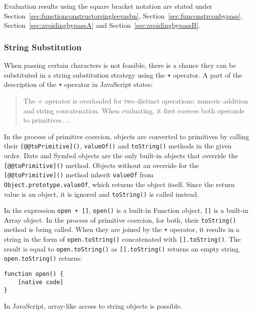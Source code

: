 Evaluation results using the square bracket notation are stated under Section~\ref{sec:functionconstructorsingleevasbn}, Section~\ref{sec:funconstrconbypass}, Section~\ref{sec:avoidingbypassA} and Section~\ref{sec:avoidingbypassB}.


\subsubsection{String Substitution}
\label{sec:stringreplace}
When passing certain characters is not feasible, there is a chance they can be substituted in a string substitution strategy using the \verb|+| operator.
A part of the description of the \verb|+| operator in JavaScript states:
\begin{quote}
	The + operator is overloaded for two distinct operations: numeric addition and string concatenation. When evaluating, it first coerces both operands to primitives. ... \cite{js/+}
\end{quote}
In the process of primitive coercion, objects are converted to primitives by calling their \verb|[@@toPrimitive]()|, \verb|valueOf()| and \verb|toString()| methods in the given order. Date and Symbol objects are the only built-in objects that override the \verb|[@@toPrimitive]()| method.
Objects without an override for the \verb|[@@toPrimitive]()| method inherit \verb|valueOf| from
\\ \verb|Object.prototype.valueOf|, which returns the object itself.
Since the return value is an object, it is ignored and \verb|toString()| is called instead. \cite{js/primitiveCoercion}

In the expression \verb|open + []|, \verb|open()| is a built-in Function object, \verb|[]| is a built-in Array object.
In the process of primitive coercion, for both, their \verb|toString()| method is being called.
When they are joined by the \verb|+| operator, it results in a string in the form of \verb|open.toString()| concatenated with \verb|[].toString()|. The result is equal to \verb|open.toString()| as \verb|[].toString()| returns an empty string. 
\verb|open.toString()| returns:

\begin{lstlisting}[style=basicStyle, caption=open.toString() in JavaScript, label={lst:opentostring}]
function open() {
    [native code]
}
\end{lstlisting}

In JavaScript, array-like access to string objects is possible. \cite{js/stringbrackets}

